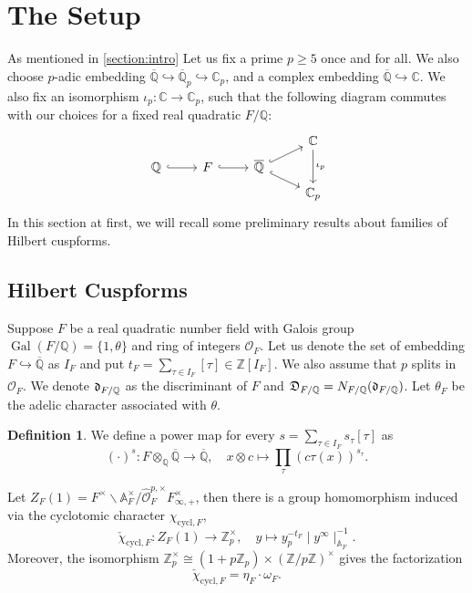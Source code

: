 \documentclass[10pt]{amsart}
\numberwithin{equation}{section}
\theoremstyle{definition}
\newtheorem{defn}[thm]{Definition}
\theoremstyle{remark} %
\newcommand{\bb}{\mathbb}
\newcommand{\mrm}{\mathrm}
\newcommand{\Gal}{\operatorname{Gal}}
\newcommand{\Oo}{\mathcal{O}}
\newcommand{\Q}{\mathbb{Q}}
\newcommand{\Z}{\mathbb{Z}}
\newcommand{\Zp}{\mathbb{Z}_p}
\begin{document}
	\section{The Setup}
	\label{section : the_setup}
	As mentioned in \cref{section:intro}	Let us fix a prime $ p \ge 5 $ once and for all. We also choose $p$-adic embedding $ \overline{\Q} \hookrightarrow \overline{\Q}_p \hookrightarrow \bb{C}_p$, and a complex embedding $ \overline{\Q} \hookrightarrow \mathbb{C}$. We also fix an isomorphism $\iota_p \colon \bb{C} \rightarrow \bb{C}_p$, such that the following diagram commutes with our choices for a fixed real quadratic $ F/\Q $:
	\begin{equation*}
		\begin{tikzcd}[row sep=tiny]
			&&& \bb{C} \arrow[dd, "\iota_p"] \\
			\Q \arrow[r, hookrightarrow] &F \arrow[r, hookrightarrow]  &\overline{\Q} \arrow[ur, hookrightarrow] \arrow[dr, hookrightarrow] & \\
			&&& \bb{C}_p 
		\end{tikzcd} 
	\end{equation*}	
	In this section at first, we will recall some preliminary results about families of Hilbert cuspforms.
	
	\subsection{Hilbert Cuspforms}
	\label{sec2.1}
	Suppose $ F $ be a real quadratic number field with Galois group $ \Gal(F/\Q) = \{1, \theta\} $ and ring of integers $ \Oo_F $. Let us denote the set of embedding $ F \hookrightarrow \overline{\Q} $ as $ I_F $ and put $ t_F = \sum_{\tau \in I_F} [\tau] \in \Z[I_F]$. We also assume that $ p $ splits in $ \Oo_F $. We denote $ \frak{d}_{F/\Q} $ as the discriminant of $ F $ and $ \frak{D}_{F/\Q} = N_{F/\Q}(\frak{d}_{F/\Q}) $. Let $ \theta_F $ be the adelic character associated with $ \theta $.
	\begin{defn}
		We define a power map for every $ s = \sum_{\tau \in I_F} s_\tau[\tau] $ as
		$$ (\cdot)^s \colon F \otimes_\Q \overline{\Q} \rightarrow \overline{\Q}, \quad x \otimes c \mapsto \prod_{\tau}(c \tau(x))^{s_\tau} . $$
	\end{defn}  
	Let $ Z_F(1) = F^\times \backslash \bb{A}_F^\times/\widehat{\Oo}^{p,\times}_F F^\times_{\infty,+} $, then there is a group homomorphism induced via the cyclotomic character $ \chi_{\mrm{cycl},F} $,
	$$ \check{\chi}_{\mrm{cycl},F} \colon Z_F(1) \rightarrow \Z_p^\times, \quad y \mapsto y_p^{-t_F}\mid y^\infty \mid^{-1}_{\bb{A}_F}. $$ 
	Moreover, the isomorphism $ \Z_p^\times \cong (1 + p\Zp) \times (\Z/p\Z)^\times$ gives the factorization 
	$$ \check{\chi}_{\mrm{cycl},F} = \eta_F \cdot \omega_F. $$
	
\end{document}

